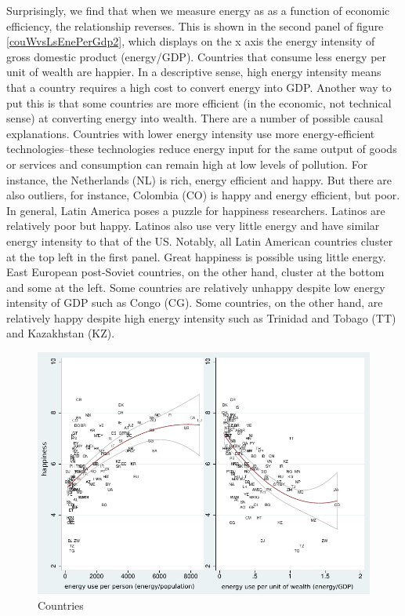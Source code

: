 \documentclass[10pt, letterpaper]{article}
\begin{document}
\begin{spacing}{1.0}
Surprisingly,  we find that when we measure energy as as a function of economic
efficiency, the relationship reverses.  This is shown in the second panel of
figure \ref{couWvsLsEnePerGdp2}, which displays on the x axis the energy intensity of gross domestic product (energy/GDP). Countries that consume less energy per unit of wealth are happier. 
%
In a descriptive sense, high energy intensity means that a country requires
a high cost to convert energy into GDP. Another way to put this is that some
countries are more efficient (in the economic, not technical sense) at
converting energy into wealth. There are a number of possible causal explanations.  Countries with lower energy intensity  use
 more energy-efficient technologies--these technologies reduce energy input 
for the same output of goods or services and consumption can remain high at low
levels of pollution.
 For instance,  the Netherlands (NL) is rich,  energy efficient and happy. But
 there are also outliers, for instance,  Colombia (CO) is  happy and energy
 efficient,  but poor.  
In general, Latin America poses a puzzle for happiness researchers. Latinos are
relatively poor but happy. Latinos also use very little  energy and have similar energy intensity to that of the  US. Notably, all Latin
 American countries cluster at the top left in the
first panel.  Great happiness is possible using little  energy. East European
post-Soviet countries, on the other hand, cluster at the bottom and some at the
left. Some countries are relatively unhappy despite low energy intensity of GDP such as Congo (CG). Some countries, on the other hand, are relatively happy
despite high energy intensity such as Trinidad and Tobago (TT) and Kazakhstan (KZ).    
\begin{figure}[H]
 \includegraphics[width=6in]{graphsAndTables/couWdhEneGdp--inkscapeEdited.pdf}\centering \caption{Countries
}
\end{figure}
\end{spacing}
\end{document}
